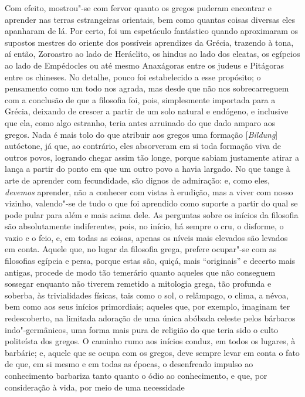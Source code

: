 Com efeito, mostrou"-se com fervor quanto os gregos puderam encontrar e
aprender nas terras estrangeiras orientais, bem como quantas coisas diversas
eles apanharam de lá. Por certo, foi um espetáculo fantástico quando
aproximaram os supostos mestres do oriente dos possíveis aprendizes da
Grécia, trazendo à tona, aí então, Zoroastro ao lado de Heráclito, os hindus
ao lado dos eleatas, os egípcios ao lado de Empédocles ou até mesmo
Anaxágoras entre os judeus e Pitágoras entre os chineses. No detalhe, pouco
foi estabelecido a esse propósito; o pensamento como um todo nos agrada, mas
desde que não nos sobrecarreguem com a conclusão de que a filosofia foi,
pois, simplesmente importada para a Grécia, deixando de crescer a partir de
um solo natural e endógeno, e inclusive que ela, como algo estranho, teria
antes arruinado do que dado amparo aos gregos. Nada é mais tolo do que
atribuir aos gregos uma formação [\textit{Bildung}] autóctone, já que, ao
contrário, eles absorveram em si toda formação viva de outros povos, logrando
chegar assim tão longe, porque sabiam justamente atirar a lança a partir do
ponto em que um outro povo a havia largado. No que tange à arte de aprender
com fecundidade, são dignos de admiração: e, como eles, \textit{devemos} 
aprender, não a conhecer com vistas à erudição, mas a viver com nosso vizinho, 
valendo"-se de tudo o que foi aprendido como suporte a partir do qual se pode 
pular para além e mais acima dele. As perguntas sobre \label{perguntassobreosinicios} 
os inícios da filosofia são absolutamente indiferentes, pois, no início, 
há sempre o cru, o disforme, o vazio e o feio,
e, em todas as coisas, apenas os níveis mais elevados são levados em conta.
Aquele que, no lugar da filosofia grega, prefere ocupar"-se com as filosofias
egípcia e persa, porque estas são, quiçá, mais ``originais'' e decerto mais
antigas, procede de modo tão temerário quanto aqueles que não conseguem
sossegar enquanto não tiverem remetido a mitologia grega, tão profunda e
soberba, às trivialidades físicas, tais como o sol, o relâmpago, o clima, a
névoa, bem como aos seus inícios primordiais; aqueles que, por exemplo,
imaginam ter redescoberto, na limitada adoração de uma única abóbada celeste
pelos bárbaros indo"-germânicos, uma forma mais pura de religião do que teria
sido o culto politeísta dos gregos. O caminho rumo aos inícios conduz, em
todos os lugares, à barbárie; e, aquele que se ocupa com os gregos, deve
sempre levar em conta o fato de que, em si mesmo e em todas as épocas, o
desenfreado impulso ao conhecimento barbariza tanto quanto o ódio ao
conhecimento, e que, por consideração à vida, por meio de uma necessidade
